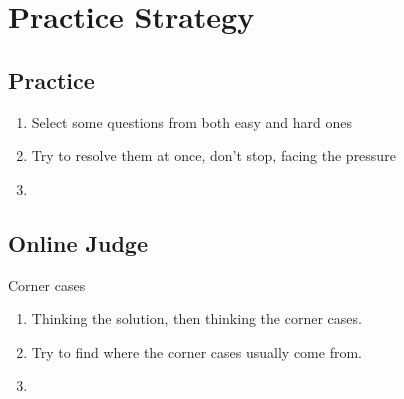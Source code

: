 \chapter{Practice Strategy}

\section{Practice }
\begin{enumerate}
    \item Select some questions from both easy and hard ones
    \item Try to resolve them at once, don't stop, facing the pressure
    \item
\end{enumerate}

\section{Online Judge }
Corner cases

\begin{enumerate}
    \item Thinking the solution, then thinking the corner cases.
    \item Try to find where the corner cases usually come from.     
    \item  
\end{enumerate}


